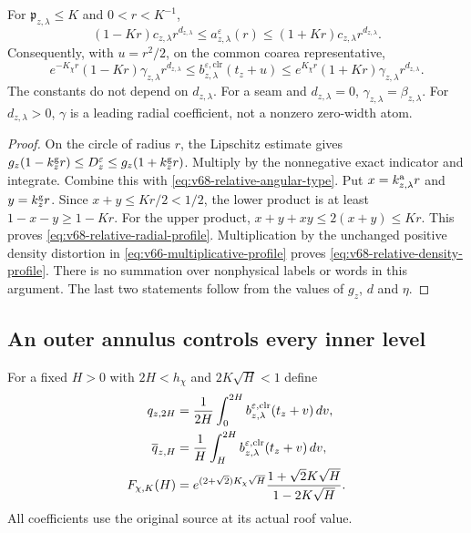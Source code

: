 \begin{theorem}
\label{thm:v68-relative-radial-profile}
For $\mathfrak p_{z,\lambda}\le K$ and $0<r<K^{-1}$,
\begin{equation}\label{eq:v68-relative-radial-profile}
 (1-Kr)c_{z,\lambda}r^{d_{z,\lambda}}
 \le a_{z,\lambda}^{\varepsilon}(r)
 \le(1+Kr)c_{z,\lambda}r^{d_{z,\lambda}}.
\end{equation}
Consequently, with $u=r^2/2$, on the common coarea representative,
\begin{equation}\label{eq:v68-relative-density-profile}
 e^{-K_\chi r}(1-Kr)\gamma_{z,\lambda}r^{d_{z,\lambda}}
 \le b_{z,\lambda}^{\varepsilon,\mathrm{clr}}(t_z+u)
 \le e^{K_\chi r}(1+Kr)\gamma_{z,\lambda}r^{d_{z,\lambda}}.
\end{equation}
The constants do not depend on $d_{z,\lambda}$. For a seam and
$d_{z,\lambda}=0$, $\gamma_{z,\lambda}=\beta_{z,\lambda}$.
For $d_{z,\lambda}>0$, $\gamma$ is a leading radial coefficient,
not a nonzero zero-width atom.
\end{theorem}
\begin{proof}
On the circle of radius $r$, the Lipschitz estimate gives
$g_z(1-k_z^{\rm g}r)\le D_z^\varepsilon\le
 g_z(1+k_z^{\rm g}r)$. Multiply by the nonnegative exact indicator
and integrate. Combine this with
\eqref{eq:v68-relative-angular-type}. Put
$x=k_{z,\lambda}^{\rm a}r$ and $y=k_z^{\rm g}r$.
Since $x+y\le Kr/2<1/2$, the lower product is at least
$1-x-y\ge1-Kr$. For the upper product,
$x+y+xy\le2(x+y)\le Kr$. This proves
\eqref{eq:v68-relative-radial-profile}. Multiplication by the unchanged
positive density distortion in
\eqref{eq:v66-multiplicative-profile} proves
\eqref{eq:v68-relative-density-profile}. There is no summation over
nonphysical labels or words in this argument. The last two statements
follow from the values of $g_z$, $d$ and $\eta$.
\end{proof}

\subsection{An outer annulus controls every inner level}
For a fixed $H>0$ with $2H<h_\chi$ and $2K\sqrt H<1$ define
\begin{align}
 q_{z,2H}&=\frac1{2H}\int_0^{2H}
              b_{z,\lambda}^{\varepsilon,\mathrm{clr}}(t_z+v)\,dv,
                \notag\\
 \overline q_{z,H}&=\frac1H\int_H^{2H}
              b_{z,\lambda}^{\varepsilon,\mathrm{clr}}(t_z+v)\,dv,
                                                        \label{eq:v68-annular-averages}\\
 F_{\chi,K}(H)&=
 e^{(2+\sqrt2)K_\chi\sqrt H}
             \frac{1+\sqrt2K\sqrt H}{1-2K\sqrt H}.
                                                        \label{eq:v68-annular-factor}
\end{align}
All coefficients use the original source at its actual roof value.

